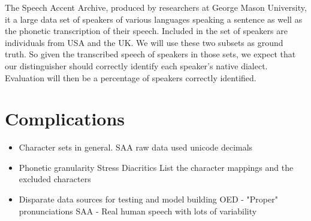 \documentclass[11pt, letterpaper, oneside]{article}
\begin{document}
	The Speech Accent Archive, produced by researchers at George Mason University, it a large data set of speakers of various languages speaking a sentence as well as the phonetic transcription of their speech.
	Included in the set of speakers are individuals from USA and the UK.
	We will use these two subsets as ground truth. So given the transcribed speech of speakers in those sets, we expect that our distinguisher should correctly identify each speaker's native dialect.
	Evaluation will then be a percentage of speakers correctly identified.
	

	

\section{Complications}

\begin{itemize}
\item Character sets in general.
	SAA raw data used unicode decimals
\item Phonetic granularity
	Stress
	Diacritics
	List the character mappings and the excluded characters
\item Disparate data sources for testing and model building
	OED - "Proper" pronunciations
	SAA - Real human speech with lots of variability

\end{itemize}





\begin{thebibliography}{9}
\end{thebibliography}
\end{document}

